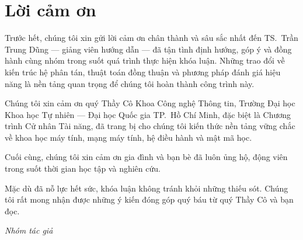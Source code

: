 \chapter*{Lời cảm ơn}

Trước hết, chúng tôi xin gửi lời cảm ơn chân thành và sâu sắc nhất đến
TS.~Trần Trung Dũng --- giảng viên hướng dẫn --- đã tận tình định hướng, góp ý
và đồng hành cùng nhóm trong suốt quá trình thực hiện khóa luận. Những trao đổi
về kiến trúc hệ phân tán, thuật toán đồng thuận và phương pháp đánh giá hiệu
năng là nền tảng quan trọng để chúng tôi hoàn thành công trình này.

Chúng tôi xin cảm ơn quý Thầy Cô Khoa Công nghệ Thông tin, Trường Đại học Khoa
học Tự nhiên --- Đại học Quốc gia TP.~Hồ Chí Minh, đặc biệt là Chương trình Cử
nhân Tài năng, đã trang bị cho chúng tôi kiến thức nền tảng vững chắc về khoa
học máy tính, mạng máy tính, hệ điều hành và mật mã học.

Cuối cùng, chúng tôi xin cảm ơn gia đình và bạn bè đã luôn ủng hộ, động viên
trong suốt thời gian học tập và nghiên cứu.

Mặc dù đã nỗ lực hết sức, khóa luận không tránh khỏi những thiếu sót. Chúng tôi
rất mong nhận được những ý kiến đóng góp quý báu từ quý Thầy Cô và bạn đọc.

\vspace{0.6cm}
\begin{flushright}
\textit{Nhóm tác giả}
\end{flushright}

